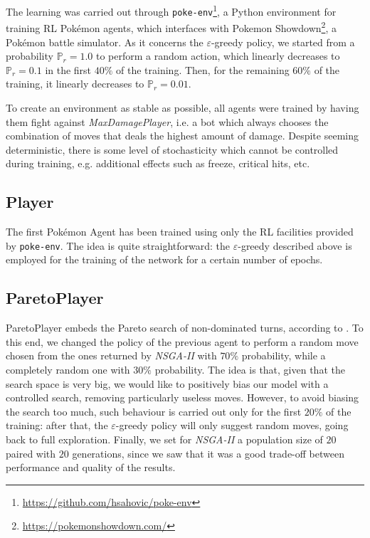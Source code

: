 

 
The learning was carried out through \texttt{poke-env}\footnote{\url{https://github.com/hsahovic/poke-env}}, a Python environment for training RL Pokémon agents, which interfaces with Pokemon Showdown\footnote{\url{https://pokemonshowdown.com/}}, a Pokémon battle simulator. As it concerns the $\varepsilon$-greedy policy, we started from a probability $\mathbb{P}_r=1.0$ to perform a random action, which linearly decreases to $\mathbb{P}_r=0.1$ in the first $40\%$ of the training. Then, for the remaining $60\%$ of the training, it linearly decreases to $\mathbb{P}_r=0.01$.

To create an environment as stable as possible, all agents were trained by having them fight against \textit{MaxDamagePlayer}, i.e. a bot which always chooses the combination of moves that deals the highest amount of damage. Despite seeming deterministic, there is some level of stochasticity which cannot be controlled during training, e.g. additional effects such as freeze, critical hits, etc.

\subsection{Player}
The first Pokémon Agent has been trained using only the RL facilities provided by \texttt{poke-env}. The idea is quite straightforward: the $\varepsilon$-greedy described above is employed for the training of the network for a certain number of epochs.

\subsection{ParetoPlayer}
ParetoPlayer embeds the Pareto search of non-dominated turns, according to . To this end, we changed the policy of the previous agent to perform a random move chosen from the ones returned by \emph{NSGA-II} with $70\%$ probability, while a completely random one with $30\%$ probability. The idea is that, given that the search space is very big, we would like to positively bias our model with a controlled search, removing particularly useless moves. However, to avoid biasing the search too much, such behaviour is carried out only for the first $20\%$ of the training: after that, the $\varepsilon$-greedy policy will only suggest random moves, going back to full exploration. Finally, we set for \emph{NSGA-II} a population size of $20$ paired with $20$ generations, since we saw that it was a good trade-off between performance and quality of the results.
